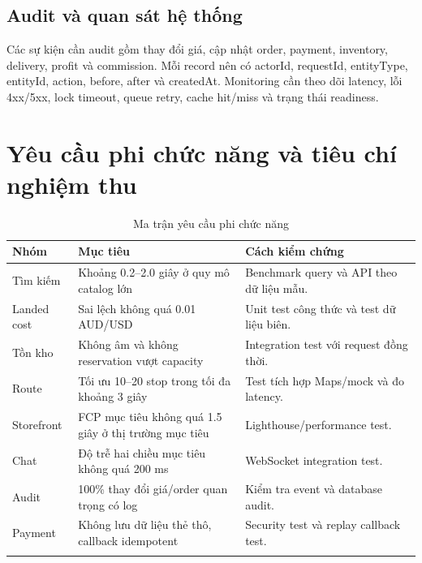 \documentclass[12pt,a4paper]{report}
\begin{document}
\section{Audit và quan sát hệ thống}
Các sự kiện cần audit gồm thay đổi giá, cập nhật order, payment, inventory, delivery, profit và commission. Mỗi record nên có actorId, requestId, entityType, entityId, action, before, after và createdAt. Monitoring cần theo dõi latency, lỗi 4xx/5xx, lock timeout, queue retry, cache hit/miss và trạng thái readiness.

\chapter{Yêu cầu phi chức năng và tiêu chí nghiệm thu}
\begin{longtable}{P{4.2cm}P{4.0cm}P{6.0cm}}
\toprule
Nhóm & Mục tiêu & Cách kiểm chứng\\
\midrule
Tìm kiếm & Khoảng 0.2--2.0 giây ở quy mô catalog lớn & Benchmark query và API theo dữ liệu mẫu.\\
Landed cost & Sai lệch không quá 0.01 AUD/USD & Unit test công thức và test dữ liệu biên.\\
Tồn kho & Không âm và không reservation vượt capacity & Integration test với request đồng thời.\\
Route & Tối ưu 10--20 stop trong tối đa khoảng 3 giây & Test tích hợp Maps/mock và đo latency.\\
Storefront & FCP mục tiêu không quá 1.5 giây ở thị trường mục tiêu & Lighthouse/performance test.\\
Chat & Độ trễ hai chiều mục tiêu không quá 200 ms & WebSocket integration test.\\
Audit & 100\% thay đổi giá/order quan trọng có log & Kiểm tra event và database audit.\\
Payment & Không lưu dữ liệu thẻ thô, callback idempotent & Security test và replay callback test.\\
\bottomrule
\caption{Ma trận yêu cầu phi chức năng}\label{tab:nfr}\\
\end{longtable}
\end{document}
